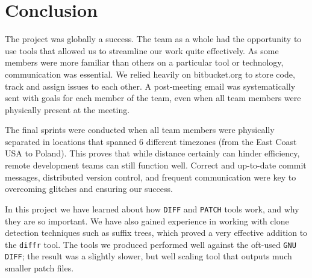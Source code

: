 \section{Conclusion}

The project was globally a success.
The team as a whole had the opportunity to use tools that allowed us to streamline our work quite effectively.
As some members were more familiar than others on a particular tool or technology, communication was essential.
We relied heavily on bitbucket.org to store code, track and assign issues to each other.
A post-meeting email was systematically sent with goals for each member of the team, even when all team members were physically present at the meeting.

The final sprints were conducted when all team members were physically separated in locations that spanned 6 different timezones (from the East Coast USA to Poland).
This proves that while distance certainly can hinder efficiency, remote development teams can still function well.
Correct and up-to-date commit messages, distributed version control, and frequent communication were key to overcoming glitches and ensuring our success.

In this project we have learned about how \texttt{DIFF} and \texttt{PATCH} tools work, and why they are so important.
We have also gained experience in working with clone detection techniques such as suffix trees, which proved a very effective addition to the \texttt{diffr} tool.
The tools we produced performed well against the oft-used \texttt{GNU DIFF}; the result was a slightly slower, but well scaling tool that outputs much smaller patch files.
